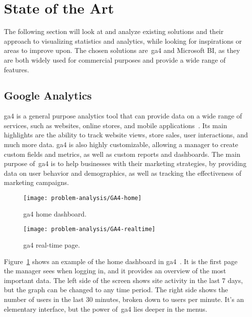 \section{State of the Art}\label{sec:state-of-the-art}

The following section will look at and analyze existing solutions and their approach to visualizing statistics and
analytics, while looking for inspirations or areas to improve upon.
The chosen solutions are~\acrlong{ga4} and Microsoft BI, as they are both widely used for commercial purposes and
provide a wide range of features.

\subsection{Google Analytics}\label{subsec:google-analytics}

\acrfull{ga4} is a general purpose analytics tool that can provide data on a wide range of services, such as websites,
online stores, and mobile applications~\cite{ga4}.
Its main highlights are the ability to track website views, store sales, user interactions, and much more data.
\acrshort{ga4} is also highly customizable, allowing a manager to create custom fields and metrics, as well as custom
reports and dashboards.
The main purpose of~\acrshort{ga4} is to help businesses with their marketing strategies, by providing data on user
behavior and demographics, as well as tracking the effectiveness of marketing campaigns.

\begin{figure}[H]
    \centering
    \texttt{[image: problem-analysis/GA4-home]}
    \caption{\acrshort{ga4} home dashboard.}\label{fig:GA4-dashboard}
\end{figure}

\begin{figure}[H]
    \centering
    \texttt{[image: problem-analysis/GA4-realtime]}
    \caption{\acrshort{ga4} real-time page.}\label{fig:GA4-realtime}
\end{figure}

Figure~\ref{fig:GA4-dashboard} shows an example of the home dashboard in \acrshort{ga4}~\cite{ga4-interface}.
It is the first page the manager sees when logging in, and it provides an overview of the most important data.
The left side of the screen shows site activity in the last 7 days, but the graph can be changed to any time period.
The right side shows the number of users in the last 30 minutes, broken down to users per minute.
It's an elementary interface, but the power of~\acrshort{ga4} lies deeper in the menus.

